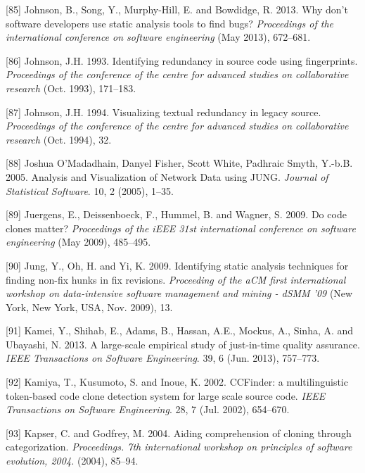 \documentclass[12pt]{report}
\begin{document}
\hypertarget{ref-Johnson2013}{}
{[}85{]} Johnson, B., Song, Y., Murphy-Hill, E. and Bowdidge, R. 2013.
Why don't software developers use static analysis tools to find bugs?
\emph{Proceedings of the international conference on software
engineering} (May 2013), 672--681.

\hypertarget{ref-Johnson1993}{}
{[}86{]} Johnson, J.H. 1993. Identifying redundancy in source code using
fingerprints. \emph{Proceedings of the conference of the centre for
advanced studies on collaborative research} (Oct. 1993), 171--183.

\hypertarget{ref-Johnson1994}{}
{[}87{]} Johnson, J.H. 1994. Visualizing textual redundancy in legacy
source. \emph{Proceedings of the conference of the centre for advanced
studies on collaborative research} (Oct. 1994), 32.

\hypertarget{ref-JoshuaOMadadhain}{}
{[}88{]} Joshua O'Madadhain, Danyel Fisher, Scott White, Padhraic Smyth,
Y.-b.B. 2005. Analysis and Visualization of Network Data using JUNG.
\emph{Journal of Statistical Software}. 10, 2 (2005), 1--35.

\hypertarget{ref-Juergens2009}{}
{[}89{]} Juergens, E., Deissenboeck, F., Hummel, B. and Wagner, S. 2009.
Do code clones matter? \emph{Proceedings of the iEEE 31st international
conference on software engineering} (May 2009), 485--495.

\hypertarget{ref-Jung2009}{}
{[}90{]} Jung, Y., Oh, H. and Yi, K. 2009. Identifying static analysis
techniques for finding non-fix hunks in fix revisions. \emph{Proceeding
of the aCM first international workshop on data-intensive software
management and mining - dSMM '09} (New York, New York, USA, Nov. 2009),
13.

\hypertarget{ref-Kamei2013}{}
{[}91{]} Kamei, Y., Shihab, E., Adams, B., Hassan, A.E., Mockus, A.,
Sinha, A. and Ubayashi, N. 2013. A large-scale empirical study of
just-in-time quality assurance. \emph{IEEE Transactions on Software
Engineering}. 39, 6 (Jun. 2013), 757--773.

\hypertarget{ref-Kamiya2002}{}
{[}92{]} Kamiya, T., Kusumoto, S. and Inoue, K. 2002. CCFinder: a
multilinguistic token-based code clone detection system for large scale
source code. \emph{IEEE Transactions on Software Engineering}. 28, 7
(Jul. 2002), 654--670.

\hypertarget{ref-Kapser}{}
{[}93{]} Kapser, C. and Godfrey, M. 2004. Aiding comprehension of
cloning through categorization. \emph{Proceedings. 7th international
workshop on principles of software evolution, 2004.} (2004), 85--94.
\end{document}
